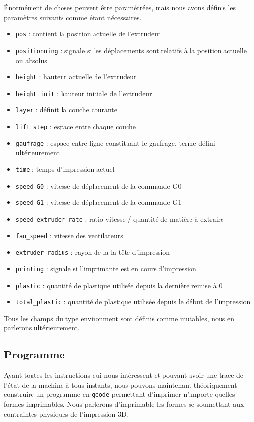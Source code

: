 \documentclass[11pt, titlepage]{article}
\begin{document}
Énormément de choses peuvent être paramétrées, mais nous avons définis les paramètres suivants comme étant nécessaires.
\begin{itemize}
  \item \verb&pos& : contient la position actuelle de l'extrudeur 
  \item \verb&positionning& : signale si les déplacements sont relatifs à la position actuelle ou absolus
  \item \verb&height& :  hauteur actuelle de l'extrudeur
  \item \verb&height_init& :  hauteur initiale de l'extrudeur
  \item \verb&layer& : définit la couche courante
  \item \verb&lift_step& : espace entre chaque couche
  \item \verb&gaufrage& : espace entre ligne constituant le gaufrage, terme défini ultérieurement
  \item \verb&time& : temps d'impression actuel
  \item \verb&speed_G0& : vitesse de déplacement de la commande G0
  \item \verb&speed_G1& : vitesse de déplacement de la commande G1
  \item \verb&speed_extruder_rate& : ratio vitesse / quantité de matière à extraire
  \item \verb&fan_speed& : vitesse des ventilateurs
  \item \verb&extruder_radius& : rayon de la la tête d'impression
  \item \verb&printing& : signale si l'imprimante est en cours d'impression
  \item \verb&plastic& : quantité de plastique utilisée depuis la dernière remise à 0
  \item \verb&total_plastic& : quantité de plastique utilisée depuis le début de l'impression
\end{itemize}
Tous les champs du type environment sont définis comme mutables, nous en parlerons ultérieurement.

\subsection{Programme}
Ayant toutes les instructions qui nous intéressent et pouvant avoir une trace de l'état de la machine à tous instants, nous pouvons maintenant théoriquement construire un programme en \verb&gcode& permettant d'imprimer n'importe quelles formes imprimables. Nous parlerons d'imprimable les formes se soumettant aux contraintes physiques de l'impression 3D.
\newline
\end{document}

